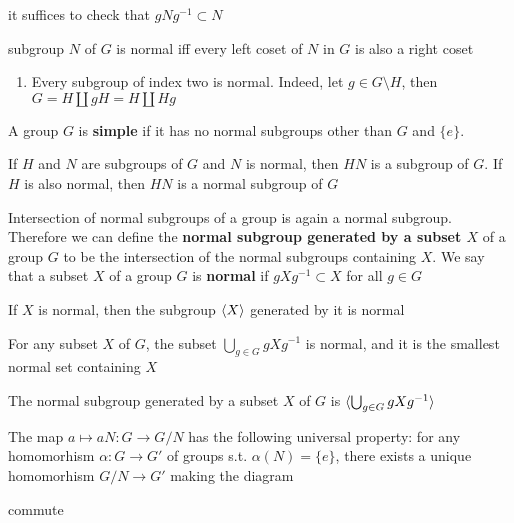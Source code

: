 \documentclass[11pt]{article}
\begin{document}
it suffices to check that \(gNg^{-1}\subset N\)

\begin{proposition}[]
subgroup \(N\) of \(G\) is normal iff every left coset of \(N\) in \(G\) is also a right coset
\end{proposition}

\begin{examplle}[]
\begin{enumerate}
\item Every subgroup of index two is normal. Indeed, let \(g\in G\setminus H\), then \(G=H\coprod gH=H\coprod Hg\)
\end{enumerate}
\end{examplle}

A group \(G\) is \textbf{simple} if it has no normal subgroups other than \(G\) and \(\{e\}\).

\begin{proposition}[]
If \(H\) and \(N\) are subgroups of \(G\) and \(N\) is normal, then \(HN\) is a subgroup
of \(G\). If \(H\) is also normal, then \(HN\) is a normal subgroup of \(G\)
\end{proposition}


Intersection of normal subgroups of a group is again a normal subgroup. Therefore we can define
the \textbf{normal subgroup generated by a subset \(X\)} of a group \(G\) to be the intersection of the
normal subgroups containing \(X\). We say that a subset \(X\) of a group \(G\) is \textbf{normal}
if \(gXg^{-1}\subset X\) for all \(g\in G\)

\begin{lemma}[]
If \(X\) is normal, then the subgroup \(\langle X\rangle\) generated by it is normal
\end{lemma}

\begin{lemma}[]
For any subset \(X\) of \(G\), the subset \(\bigcup_{g\in G}gXg^{-1}\) is normal, and it is the smallest
normal set containing \(X\)
\end{lemma}

\begin{proposition}[]
The normal subgroup generated by a subset \(X\) of \(G\) is \(\langle\bigcup_{g\in G}gXg^{-1}\rangle\)
\end{proposition}

\begin{proposition}[]
The map \(a\mapsto aN:G\to G/N\) has the following universal property: for any homomorhism \(\alpha:G\to G'\)
of groups s.t. \(\alpha(N)=\{e\}\), there exists a unique homomorhism \(G/N\to G'\) making the diagram
\begin{center}\end{center}
commute
\end{proposition}
\end{document}
